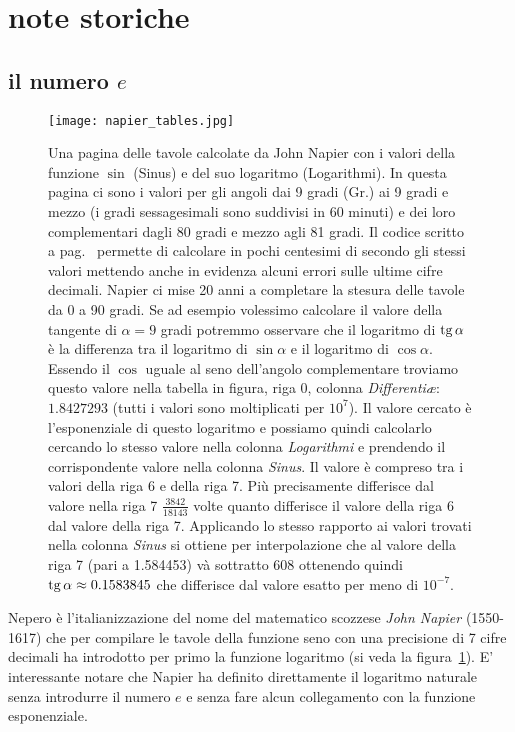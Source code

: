 \section{note storiche}

\subsection{il numero $e$}

\begin{figure}
  \begin{center}
  \texttt{[image: napier\_tables.jpg]}
  \end{center}
  \caption{Una pagina delle tavole calcolate da John Napier
  con i valori della funzione $\sin$ (Sinus) e del suo logaritmo
  (Logarithmi).
  In questa pagina ci sono i valori 
  per gli angoli dai 9 gradi (Gr.) ai 9 gradi e mezzo (i gradi 
  sessagesimali sono suddivisi in 60 minuti) e 
  dei loro complementari dagli 80 gradi e mezzo agli 81 gradi.
  Il codice scritto a pag.~\pageref{code:napier} permette
  di calcolare in pochi centesimi di secondo gli stessi valori
  mettendo anche in evidenza alcuni errori sulle ultime cifre decimali.
  Napier ci mise 20 anni a completare la stesura 
  delle tavole da 0 a 90 gradi.
  Se ad esempio volessimo calcolare il valore della tangente di $\alpha=9$ gradi 
  potremmo osservare che il logaritmo di $\operatorname{tg} \alpha$ 
  è la differenza tra il logaritmo di $\sin \alpha$ e il 
  logaritmo di $\cos \alpha$.
  Essendo il $\cos$ uguale al seno dell'angolo complementare 
  troviamo questo valore nella tabella in figura, 
  riga 0, colonna 
  \emph{Differenti\ae}: $1.8427293$ 
  (tutti i valori sono moltiplicati per $10^7$).
  Il valore cercato è l'esponenziale di questo 
  logaritmo e possiamo quindi calcolarlo cercando 
  lo stesso valore nella colonna \emph{Logarithmi}
  e prendendo il corrispondente valore nella colonna 
  \emph{Sinus}. Il valore è compreso tra i valori 
  della riga 6 e della riga 7. Più precisamente 
  differisce dal valore nella riga 7 
  $\frac{3842}{18143}$ volte quanto differisce il valore 
  della riga 6 dal valore della riga 7. 
  Applicando lo stesso rapporto ai valori trovati 
  nella colonna \emph{Sinus} si ottiene
  per interpolazione che al valore 
  della riga 7 (pari a 1.584453) và 
  sottratto 608 ottenendo quindi $\operatorname{tg} \alpha \approx 0.1583845$
  che differisce dal valore 
  esatto per meno di $10^{-7}$.
  }
  \label{fig:napier}
\end{figure}

\label{nota:Nepero}%
%
%
\label{Euler!Leonhard}%
\label{Eulero}%
Nepero è l'italianizzazione del nome del
matematico scozzese \emph{John Napier} (1550-1617)
che per compilare le tavole della funzione seno
con una precisione di 7 cifre decimali ha introdotto 
per primo la funzione logaritmo (si veda la figura~\ref{fig:napier}).
E' interessante notare che Napier ha definito direttamente 
il logaritmo naturale senza introdurre il numero $e$ 
e senza fare alcun collegamento con la funzione esponenziale.

